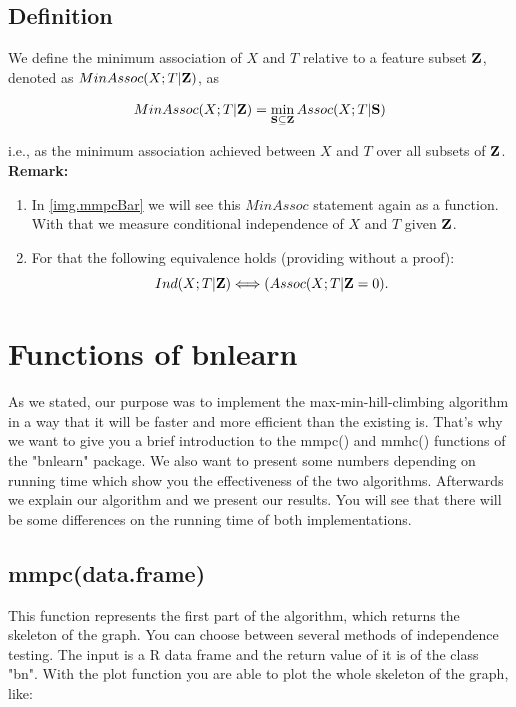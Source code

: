 	\section{Definition} \label{s.Def9}

		We define the minimum association of $X$ and $T$ relative to a feature subset ${\textbf{Z}}$, denoted as $MinAssoc(X; T | {\textbf{Z}})$, as

		\begin{equation}
			MinAssoc (X; T | {\textbf{Z}}) = \min_{{\textbf{S}} \subseteq {\textbf{Z}}} Assoc(X; T | {\textbf{S}})
		\end{equation}

		i.e., as the minimum association achieved between $X$ and $T$ over all subsets of ${\textbf{Z}}$. \\
		\textbf{Remark:}
		\begin{enumerate}
			\item In \autoref{img.mmpcBar} we will see this $MinAssoc$ statement again as a function. With that we measure conditional independence of $X$ and $T$ given ${\textbf{Z}}$.
			\item For that the following equivalence holds (providing without a proof): 
				\begin{equation}
					Ind(X; T | {\textbf{Z}}) \Longleftrightarrow (Assoc(X; T | {\textbf{Z}} = 0).
				\end{equation}
		\end{enumerate}

\chapter{Functions of bnlearn}

	As we stated, our purpose was to implement the max-min-hill-climbing algorithm in a way that it will be faster and more efficient than the existing is. That's why we want to give you a brief introduction to the mmpc() and mmhc() functions of the "bnlearn" package. We also want to present some numbers depending on running time which show you the effectiveness of the two algorithms. Afterwards we explain our algorithm and we present our results. You will see that there will be some differences on the running time of both implementations.

	\section{mmpc(data.frame)}

		This function represents the first part of the algorithm, which returns the skeleton of the graph. You can choose between several methods of independence testing. The input is a R data frame and the return value of it is of the class "bn". With the plot function you are able to plot the whole skeleton of the graph, like:
		
